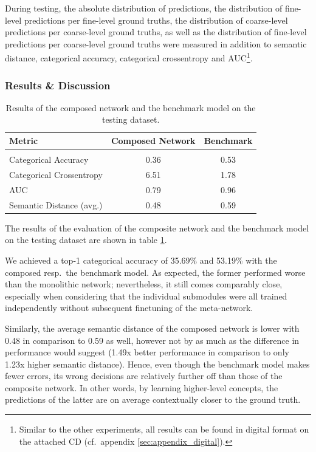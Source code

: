 During testing, the absolute distribution of predictions, the distribution of fine-level predictions per fine-level ground truths, the distribution of coarse-level predictions per coarse-level ground truths, as well as the distribution of fine-level predictions per coarse-level ground truths were measured in addition to semantic distance, categorical accuracy, categorical crossentropy and AUC\footnote{Similar to the other experiments, all results can be found in digital format on the attached CD (cf.\ appendix \ref{sec:appendix_digital}).}.
               
\subsubsection{Results \& Discussion%
               \label{sec:experiments_cifar100_results}}

\begin{table}
    \centering
    \begin{tabular}{|l|c|c|}
        \hline
        \textbf{Metric} & \textbf{Composed Network} & \textbf{Benchmark} \\
        \hline
        \multicolumn{3}{c}{} \\[-2ex]
        \hline
        Categorical Accuracy & 0.36 & 0.53 \\
        \hline
        Categorical Crossentropy & 6.51 & 1.78 \\
        \hline
        AUC & 0.79 & 0.96 \\
        \hline
        Semantic Distance (avg.) & 0.48 & 0.59 \\
        \hline
    \end{tabular}
    \caption{Results of the composed network and the benchmark model on the testing dataset.}
    \label{tab:experiments_cifar100_results_comparison}
\end{table}

The results of the evaluation of the composite network and the benchmark model on the testing dataset are shown in table \ref{tab:experiments_cifar100_results_comparison}.

We achieved a top-1 categorical accuracy of 35.69\% and 53.19\% with the composed resp.\ the benchmark model. As expected, the former performed worse than the monolithic network; nevertheless, it still comes comparably close, especially when considering that the individual submodules were all trained independently without subsequent finetuning of the meta-network. 

Similarly, the average semantic distance of the composed network is lower with 0.48 in comparison to 0.59 as well, however not by as much as the difference in performance would suggest (1.49x better performance in comparison to only 1.23x higher semantic distance). Hence, even though the benchmark model makes fewer errors, its wrong decisions are relatively further off than those of the composite network. In other words, by learning higher-level concepts, the predictions of the latter are on average contextually closer to the ground truth.

